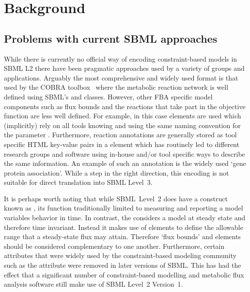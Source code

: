 
\section{Background}
\label{background}

\subsection{Problems with current SBML approaches}

While there is currently no official way of encoding constraint-based models
in SBML L2 there have been pragmatic approaches used by a variety of groups
and applications. Arguably the most comprehensive and widely used format is
that used by the \textsf{COBRA toolbox}~\citep{cobra} where the metabolic
reaction network is well defined using SBML's \Reaction and \Species
classes. However, other FBA specific model components such as flux bounds
and the reactions that take part in the objective function are less well
defined. For example, in this case \LocalParameter elements are used which (implicitly) rely on all tools knowing and using the same naming convention for the parameter . Furthermore, reaction annotations are generally stored as tool specific HTML key-value pairs in a \Notes element which has routinely
led to different research groups and software using in-house and/or tool
specific ways to describe the same information.
%
An example of such an annotation is the widely used `gene protein association'.
%
While a step in the right direction, this encoding is not suitable for
direct translation into SBML Level~3.

It is perhaps worth noting that while SBML~Level~2 does have a construct known as \Constraint, its function traditionally limited to measuring and reporting a model variables behavior in time. In contrast, the \FBCPackage considers a model at steady state and therefore time invariant. Instead it makes use of \Parameter elements to define the allowable range that a steady-state flux may attain. Therefore `flux bounds' and \Constraint elements should be considered complementary to one another.
%
Furthermore, certain attributes that were widely used by the constraint-based modeling community such as the \Species attribute  were removed in later versions of SBML. This has had the effect that a significant number of constraint-based modelling and metabolic flux analysis software still make use of SBML Level~2 Version~1.

